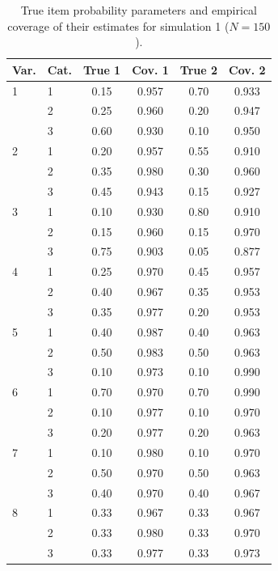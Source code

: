 \begin{table}[H]
\centering
\begin{tabular}{llcccc}
  \toprule
\textbf{Var.} & \textbf{Cat.} & \textbf{True 1} & \textbf{Cov. 1} & \textbf{True 2} & \textbf{Cov. 2} \\ 
  \midrule
1 & 1 & 0.15 & 0.957 & 0.70 & 0.933 \\ 
   & 2 & 0.25 & 0.960 & 0.20 & 0.947 \\ 
   & 3 & 0.60 & 0.930 & 0.10 & 0.950 \\ 
  2 & 1 & 0.20 & 0.957 & 0.55 & 0.910 \\ 
   & 2 & 0.35 & 0.980 & 0.30 & 0.960 \\ 
   & 3 & 0.45 & 0.943 & 0.15 & 0.927 \\ 
  3 & 1 & 0.10 & 0.930 & 0.80 & 0.910 \\ 
   & 2 & 0.15 & 0.960 & 0.15 & 0.970 \\ 
   & 3 & 0.75 & 0.903 & 0.05 & 0.877 \\ 
  4 & 1 & 0.25 & 0.970 & 0.45 & 0.957 \\ 
   & 2 & 0.40 & 0.967 & 0.35 & 0.953 \\ 
   & 3 & 0.35 & 0.977 & 0.20 & 0.953 \\ 
  5 & 1 & 0.40 & 0.987 & 0.40 & 0.963 \\ 
   & 2 & 0.50 & 0.983 & 0.50 & 0.963 \\ 
   & 3 & 0.10 & 0.973 & 0.10 & 0.990 \\ 
  6 & 1 & 0.70 & 0.970 & 0.70 & 0.990 \\ 
   & 2 & 0.10 & 0.977 & 0.10 & 0.970 \\ 
   & 3 & 0.20 & 0.977 & 0.20 & 0.963 \\ 
  7 & 1 & 0.10 & 0.980 & 0.10 & 0.970 \\ 
   & 2 & 0.50 & 0.970 & 0.50 & 0.963 \\ 
   & 3 & 0.40 & 0.970 & 0.40 & 0.967 \\ 
  8 & 1 & 0.33 & 0.967 & 0.33 & 0.967 \\ 
   & 2 & 0.33 & 0.980 & 0.33 & 0.970 \\ 
   & 3 & 0.33 & 0.977 & 0.33 & 0.973 \\ 
   \bottomrule
\end{tabular}
\caption{True item probability parameters and empirical coverage of their estimates for simulation 1 ($N = 150$).} 
\label{table:sim1_item_prob_coverage_N150}
\end{table}
